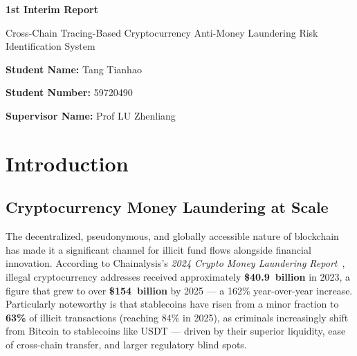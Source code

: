 \documentclass[12pt,a4paper]{article}
\begin{document}
\begin{titlepage}
    \centering
    \vspace*{2cm}
    {\Huge\bfseries 1st Interim Report\par}
    \vspace{2cm}

    {\huge Cross-Chain Tracing-Based Cryptocurrency Anti-Money Laundering Risk Identification System\par}

    \vfill

    {\large \textbf{Student Name:} Tang Tianhao\par}
    \vspace{0.5cm}
    {\large \textbf{Student Number:} 59720490\par}
    \vspace{1.5cm}
    {\large \textbf{Supervisor Name:} Prof LU Zhenliang\par}
    \vspace{1.5cm}
\end{titlepage}

\newpage
\tableofcontents
\thispagestyle{empty}
\newpage
\clearpage
\setcounter{page}{1}

\section{Introduction}

\subsection{Cryptocurrency Money Laundering at Scale}

The decentralized, pseudonymous, and globally accessible nature of blockchain has made it a significant channel for illicit fund flows alongside financial innovation. According to Chainalysis's \textit{2024 Crypto Money Laundering Report}~\cite{chainalysis2024}, illegal cryptocurrency addresses received approximately \textbf{\$40.9~billion} in 2023, a figure that grew to over \textbf{\$154~billion} by 2025 --- a 162\% year-over-year increase. Particularly noteworthy is that stablecoins have risen from a minor fraction to \textbf{63\%} of illicit transactions (reaching 84\% in 2025), as criminals increasingly shift from Bitcoin to stablecoins like USDT --- driven by their superior liquidity, ease of cross-chain transfer, and larger regulatory blind spots.
\end{document}
